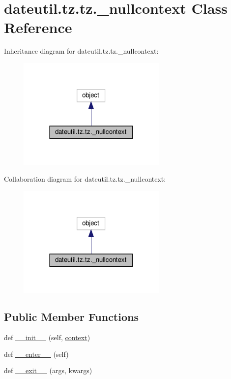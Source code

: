 \hypertarget{classdateutil_1_1tz_1_1tz_1_1__nullcontext}{}\section{dateutil.\+tz.\+tz.\+\_\+nullcontext Class Reference}
\label{classdateutil_1_1tz_1_1tz_1_1__nullcontext}


Inheritance diagram for dateutil.\+tz.\+tz.\+\_\+nullcontext\+:
\nopagebreak
\begin{figure}[H]
\begin{center}
\leavevmode
\includegraphics[width=206pt]{classdateutil_1_1tz_1_1tz_1_1__nullcontext__inherit__graph}
\end{center}
\end{figure}


Collaboration diagram for dateutil.\+tz.\+tz.\+\_\+nullcontext\+:
\nopagebreak
\begin{figure}[H]
\begin{center}
\leavevmode
\includegraphics[width=206pt]{classdateutil_1_1tz_1_1tz_1_1__nullcontext__coll__graph}
\end{center}
\end{figure}
\subsection*{Public Member Functions}
\begin{DoxyCompactItemize}
\item 
def \hyperlink{classdateutil_1_1tz_1_1tz_1_1__nullcontext_a35756481da82fbc41b52c1693ef3012f}{\+\_\+\+\_\+init\+\_\+\+\_\+} (self, \hyperlink{classdateutil_1_1tz_1_1tz_1_1__nullcontext_abd282f262c7156ea82af1261fbc392b7}{context})
\item 
def \hyperlink{classdateutil_1_1tz_1_1tz_1_1__nullcontext_a90b160d70fbd928ab1608ad8ee6a7b6f}{\+\_\+\+\_\+enter\+\_\+\+\_\+} (self)
\item 
def \hyperlink{classdateutil_1_1tz_1_1tz_1_1__nullcontext_abbdf52ea291cbeb0b9997ba2225e8825}{\+\_\+\+\_\+exit\+\_\+\+\_\+} (args, kwargs)
\end{DoxyCompactItemize}
